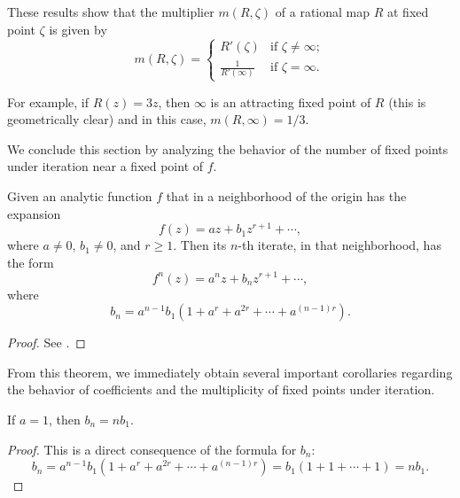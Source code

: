 \begin{remark}
    These results show that the multiplier $m(R, \zeta)$ of a rational map $R$
    at fixed point $\zeta$ is given by
    \[
        m(R, \zeta) =
        \begin{cases}
            R'(\zeta) & \text{if } \zeta \neq \infty; \\
            \frac{1}{R'(\infty)} & \text{if } \zeta = \infty.
        \end{cases}
    \]
\end{remark}

\begin{example}
    For example, if $R(z) = 3z$, then $\infty$ is an attracting fixed point of
    $R$ (this is geometrically clear) and in this case, $m(R, \infty) = 1/3$.
\end{example}

We conclude this section by analyzing the behavior of the number of fixed points
under iteration near a fixed point of $f$.

\begin{theorem}
    Given an analytic function $f$ that in a neighborhood of the origin has the
    expansion
    \[
        f(z) = a z + b_1 z^{r+1} + \cdots,
    \]
    where $a \neq 0$, $b_1 \neq 0$, and $r \geq 1$. Then its $n$-th iterate, in
    that neighborhood, has the form
    \[
        f^n(z) = a^n z + b_n z^{r+1} + \cdots,
    \]
    where
    \[
        b_n = a^{n-1} b_1 \left( 1 + a^r + a^{2r} + \cdots + a^{(n-1)r} \right).
    \]
\end{theorem}
\begin{proof}
    See \cite[42]{Beardon1991}.
\end{proof}

From this theorem, we immediately obtain several important corollaries regarding
the behavior of coefficients and the multiplicity of fixed points under
iteration.

\begin{corollary}[$a = 1 \implies b_n = n b_1$]
    \label{cor:a_equals_1_implies_bn_equals_nb1}
    If $a = 1$, then $b_n = n b_1$.
\end{corollary}
\begin{proof}
    This is a direct consequence of the formula for $b_n$:
    \[
        b_n = a^{n-1} b_1 \left( 1 + a^r + a^{2r} + \cdots + a^{(n-1)r} \right) = b_1 (1 + 1 + \cdots + 1) = n b_1.
    \]
\end{proof}

